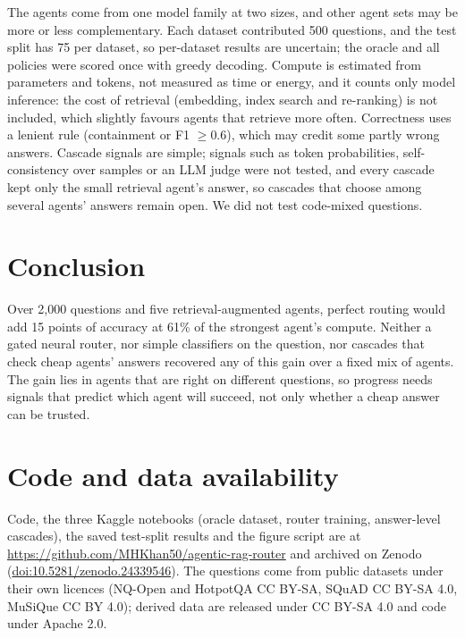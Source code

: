 \documentclass[11pt,a4paper]{article}
\begin{document}
The agents come from one model family at two sizes, and other agent sets may be more or less complementary. Each
dataset contributed 500 questions, and the test split has 75 per dataset, so per-dataset results are uncertain; the
oracle and all policies were scored once with greedy decoding. Compute is estimated from parameters and tokens, not
measured as time or energy, and it counts only model inference: the cost of retrieval (embedding, index search and
re-ranking) is not included, which slightly favours agents that retrieve more often. Correctness uses a lenient rule (containment or F1 $\ge 0.6$), which may credit some
partly wrong answers. Cascade signals are simple; signals such as token probabilities, self-consistency over samples
or an LLM judge were not tested, and every cascade kept only the small retrieval agent's answer, so cascades that
choose among several agents' answers remain open. We did not test code-mixed questions.

\section{Conclusion}

Over 2,000 questions and five retrieval-augmented agents, perfect routing would add 15 points of accuracy at 61\% of
the strongest agent's compute. Neither a gated neural router, nor simple classifiers on the question, nor cascades
that check cheap agents' answers recovered any of this gain over a fixed mix of agents. The gain lies in agents that
are right on different questions, so progress needs signals that predict which agent will succeed, not only whether
a cheap answer can be trusted.

\section*{Code and data availability}

Code, the three Kaggle notebooks (oracle dataset, router training, answer-level cascades), the saved test-split
results and the figure script are at \url{https://github.com/MHKhan50/agentic-rag-router} and archived on
Zenodo (\href{https://doi.org/10.5281/zenodo.24339546}{doi:10.5281/zenodo.24339546}). The questions come from
public datasets under their own licences (NQ-Open and HotpotQA CC BY-SA, SQuAD CC BY-SA 4.0, MuSiQue CC BY 4.0);
derived data are released under CC BY-SA 4.0 and code under Apache 2.0.



\end{document}
